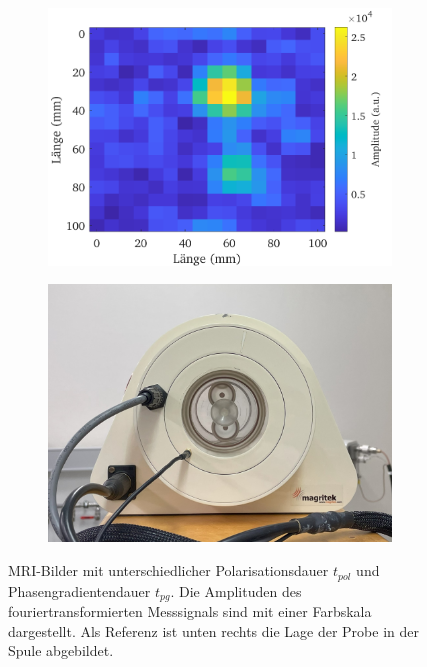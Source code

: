 \documentclass[../../main.tex]{subfiles}
\begin{document}
\begin{figure}[H]
\begin{subfigure}[c]{0.5\textwidth}
            \end{subfigure}
            \begin{subfigure}[c]{0.5\textwidth}
                \includegraphics[width=\linewidth]{Bilddateien/13/YZ-500-50/Fig_1}
                \label{fig:MRI_2D_YZ_500_50}
            \end{subfigure}
            \begin{subfigure}[c]{0.5\textwidth}
                \includegraphics[width=\linewidth]{Bilddateien/13/MRI_Phantom_crop.jpg}
                \label{fig:MRI_2D_Phantom}
            \end{subfigure}
            \caption{MRI-Bilder mit unterschiedlicher Polarisationsdauer $t_{pol}$ und Phasengradientendauer $t_{pg}$. Die Amplituden des fouriertransformierten Messsignals sind mit einer Farbskala dargestellt. Als Referenz ist unten rechts die Lage der Probe in der Spule abgebildet.}
            \label{fig:MRI_2D}
        \end{figure}
\end{document}
